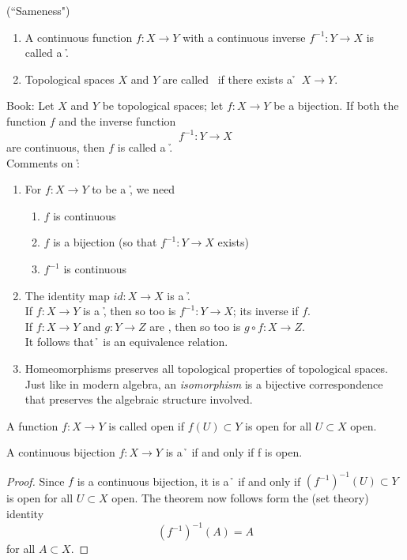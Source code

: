 \begin{customdefinition}{3.2}[\Hs] (``Sameness")
\begin{enumerate}
    \item[1).] A continuous function $f: X \longrightarrow Y$ with a continuous inverse $f^{-1}: Y \longrightarrow X$ is called a \h.
    \item[2).] Topological spaces $X$ and $Y$ are called \hc\, if there exists a \h $\,\,\,X \longrightarrow Y$.
\end{enumerate}
Book: Let $X$ and $Y$ be topological spaces; let $f: X \longrightarrow Y$ be a bijection. If both the function $f$ and the inverse function 
        $$f^{-1}: Y \longrightarrow X$$
        are continuous, then $f$ is called a \h.\\
Comments on \h: \begin{enumerate}
    \item[1).] For $f: X \longrightarrow Y$ to be a \h, we need 
        \begin{enumerate}
            \item[i).] $f$ is continuous
            \item[ii).] $f$ is a bijection (so that $f^{-1}: Y \longrightarrow X$ exists)
            \item[iii).] $f^{-1}$ is continuous
        \end{enumerate}
    \item[2).] The identity map $id: X \longrightarrow X$ is a \h.\\
                If $f: X \longrightarrow Y$ is a \h, then so too is $f^{-1}: Y \longrightarrow X$; its inverse if $f$.\\
                If $f: X \longrightarrow Y$ and $g: Y \longrightarrow Z$ are \hs, then so too is $g\circ f : X \longrightarrow Z$.\\
                It follows that \h\, is an equivalence relation.
    \item[3).] Homeomorphisms preserves all topological properties of topological spaces. Just like in modern algebra, an \emph{isomorphism} is a bijective correspondence that preserves the algebraic structure involved.
\end{enumerate}
\end{customdefinition}

\begin{customdefinition}{3.3}
A function $f: X \longrightarrow Y$ is called open if $f(U) \subset Y$ is open for all $U \subset X$ open.
\end{customdefinition}

\begin{customthm}{3.5}
A continuous bijection 
$f: X \longrightarrow Y$
is a \h \, if and only if f is open.
\end{customthm}

\begin{proof}
Since $f$ is a continuous bijection, it is a \h\, if and only if $\left(f^{-1}\right)^{-1} (U) \subset Y$ is open for all $U \subset X$ open. The theorem now follows form the (set theory) identity
    $$\left(f^{-1}\right)^{-1} (A) = A$$
    for all $A \subset X$.
\end{proof}